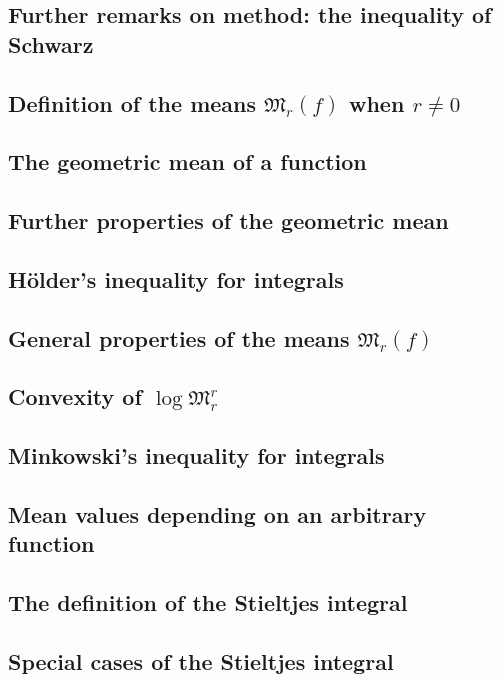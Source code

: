 \documentclass[oneside]{book}
\numberwithin{equation}{section}
\begin{document}
\subsection{Further remarks on method: the inequality of Schwarz}

\subsection{Definition of the means $\mathfrak{M}_r(f)$ when $r\ne 0$}

\subsection{The geometric mean of a function}

\subsection{Further properties of the geometric mean}

\subsection{H\"older's inequality for integrals}

\subsection{General properties of the means $\mathfrak{M}_r(f)$}

\subsection{Convexity of $\log\mathfrak{M}_r^r$}

\subsection{Minkowski's inequality for integrals}

\subsection{Mean values depending on an arbitrary function}

\subsection{The definition of the Stieltjes integral}

\subsection{Special cases of the Stieltjes integral}
\end{document}
